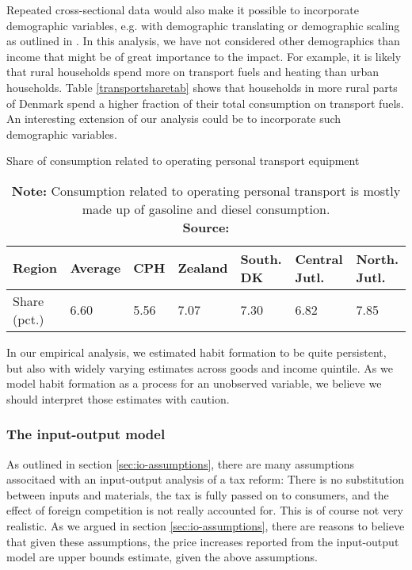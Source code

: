 Repeated cross-sectional data would also make it possible to incorporate demographic variables, e.g. with demographic translating or demographic scaling as outlined in \cite{pollak1992demand}. In this analysis, we have not considered other demographics than income that might be of great importance to the impact. For example, it is likely that rural households spend more on transport fuels and heating than urban households. Table \ref{transportsharetab} shows that households in more rural parts of Denmark spend a higher fraction of their total consumption on transport fuels. An interesting extension of our analysis could be to incorporate such demographic variables.
\begin{table}[H]
\centering
\caption{Share of consumption related to operating personal transport equipment}
\label{transportsharetab}
\begin{tabular}{lllllll} \hline
Region & Average & CPH & Zealand & South. DK & Central Jutl. & North. Jutl. \\ \hline
Share (pct.) & 6.60    & 5.56       & 7.07    & 7.30        & 6.82            & 7.85 \\ \hline
\end{tabular}
\label{tabdirectemissions}
\captionsetup{singlelinecheck=off,size=scriptsize}
\setlength{\captionmargin}{10pt}
\caption*{
\textbf{Note:} Consumption related to operating personal transport is mostly made up of gasoline and diesel consumption. \\ \textbf{Source:} \citet[Table FU07]{statbank} }
\end{table}

In our empirical analysis, we estimated habit formation to be quite persistent, but also with widely varying estimates across goods and income quintile. As we model habit formation as a process for an unobserved variable, we believe we should interpret those estimates with caution. 

\subsubsection{The input-output model}
As outlined in section \ref{sec:io-assumptions}, there are many assumptions associtaed with an input-output analysis of a tax reform: There is no substitution between inputs and materials, the tax is fully passed on to consumers, and the effect of foreign competition is not really accounted for. This is of course not very realistic. As we argued in section \ref{sec:io-assumptions}, there are reasons to believe that given these assumptions, the price increases reported from the input-output model are upper bounds estimate, given the above assumptions. 

